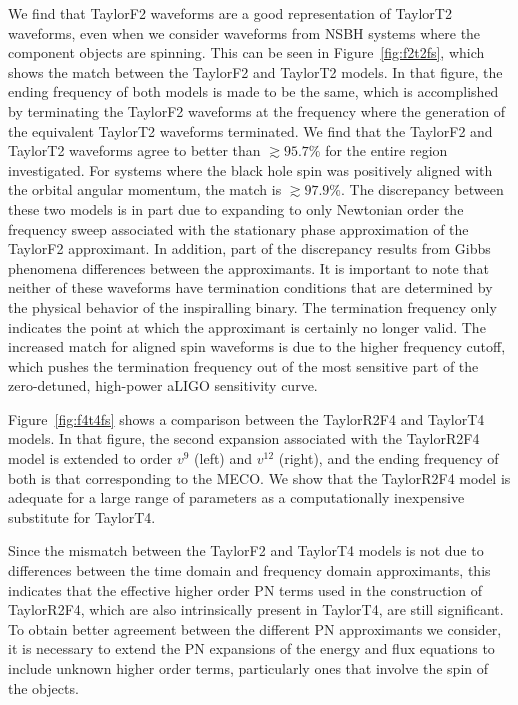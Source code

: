 We find that TaylorF2 waveforms are a good representation of
TaylorT2 waveforms, even when we consider waveforms from \ac{NSBH} systems
where the component objects are spinning. This can be seen in
Figure~\ref{fig:f2t2fs}, which shows the match between the TaylorF2 and
TaylorT2 models. In that figure, the ending frequency of both models is made to
be the same, which is accomplished by terminating the TaylorF2 waveforms at the
frequency where the generation of the equivalent TaylorT2 waveforms terminated.
We find that the TaylorF2 and TaylorT2 waveforms agree to better than $\gtrsim
95.7\%$ for the entire region investigated. For systems where the black hole
spin was positively aligned with the orbital angular momentum, the match is
$\gtrsim 97.9\%$. The discrepancy between these two models is in part due to
expanding to only Newtonian order the frequency sweep associated with the
stationary phase approximation of the TaylorF2 approximant. In addition, part
of the discrepancy results from Gibbs phenomena differences between the
approximants.
It is important to note that neither of these waveforms have termination
conditions that are determined by the physical behavior of the inspiralling
binary. The termination frequency only indicates the point at which the
approximant is certainly no longer valid. The increased match for aligned spin
waveforms is due to the higher frequency cutoff, which pushes the termination
frequency out of the most sensitive part of the zero-detuned, high-power aLIGO
sensitivity curve.

Figure~\ref{fig:f4t4fs} shows a comparison between the TaylorR2F4 and TaylorT4
models. In that figure, the second expansion associated with the TaylorR2F4
model is extended to order $v^{9}$ (left) and $v^{12}$ (right), and the ending frequency of both
is that corresponding to the \ac{MECO}.  We show that the TaylorR2F4 model is
adequate for a large range of parameters as a computationally inexpensive
substitute for TaylorT4. 

Since the mismatch between the TaylorF2 and TaylorT4 models is not due to
differences between the time domain and frequency domain approximants, this
indicates that the effective higher order \ac{PN} terms used in the
construction of TaylorR2F4, which are also intrinsically present in TaylorT4,
are still significant. To obtain better agreement between the
different \ac{PN} approximants we consider, it is necessary to extend the
\ac{PN} expansions of the energy and flux equations to include 
unknown higher order terms, particularly ones that involve 
the spin of the objects. 

